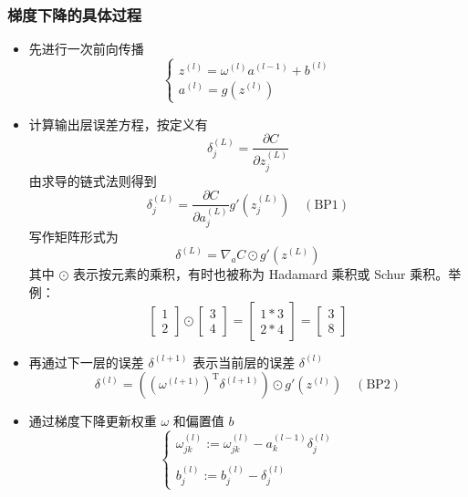 \subsubsection{梯度下降的具体过程}
\begin{itemize}
    \item 先进行一次前向传播
    \begin{equation}
        \begin{cases}
            z^{(l)} = \omega^{(l)}a^{(l-1)} + b^{(l)} \\
            a^{(l)} = g\left(z^{(l)}\right)
            \end{cases}
    \end{equation}
    \item 计算输出层误差方程，按定义有
    \begin{equation}
        \delta_j^{(L)} = \dfrac{\partial C}{\partial z_j^{(L)}}
    \end{equation}
    由求导的链式法则得到
    \begin{equation}
        \delta_j^{(L)} = \dfrac{\partial C}{\partial a_j^{(L)}} g'\left(z_j^{(L)}\right) \quad {(\text{BP}1)}
        \label{BP1} 
    \end{equation}
    写作矩阵形式为
    \begin{equation}
        \delta^{(L)} = \nabla_aC \odot g'\left(z^{(L)}\right)
    \end{equation}
    其中 $\odot$ 表示按元素的乘积，有时也被称为 Hadamard 乘积或 Schur 乘积。举例：
    \begin{equation*}
        \begin{bmatrix}1 \\ 2\end{bmatrix} \odot 
        \begin{bmatrix}3 \\ 4\end{bmatrix} = 
        \begin{bmatrix}1 * 3 \\ 2 * 4\end{bmatrix} = \begin{bmatrix}3 \\ 8\end{bmatrix}
    \end{equation*}
    \item 再通过下一层的误差 $\delta^{(l+1)}$ 表示当前层的误差 $\delta^{(l)}$
    \begin{equation}
        \delta^{(l)} = \left((\omega^{(l+1)})^\mathrm{T}\delta^{(l+1)}\right) \odot g'\left(z^{(l)}\right) \quad (\text{BP}2)
        \label{BP2}
    \end{equation}
    \item 通过梯度下降更新权重 $\omega$ 和偏置值 $b$
    \begin{equation}
        \begin{cases}
            \omega_{jk}^{(l)} := \omega_{jk}^{(l)} - a_k^{(l-1)}\delta_j^{(l)} \\
            \\
            b_j^{(l)} := b_j^{(l)} - \delta_j^{(l)}
        \end{cases}
    \end{equation}
\end{itemize}

